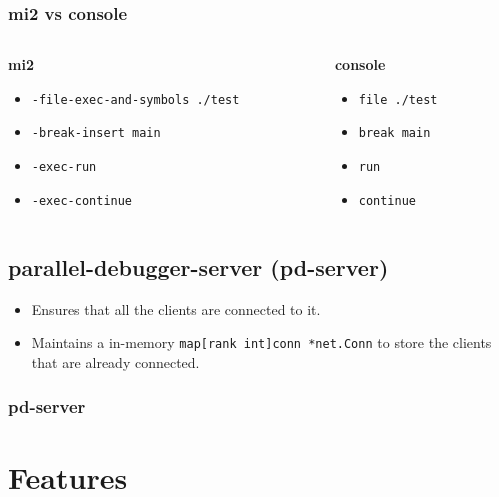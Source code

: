 \documentclass{beamer}
\begin{document}
\begin{frame}
  \frametitle{mi2 vs console}
  \begin{columns}
      \begin{column}{0.5\textwidth}
        \begin{center}
          \textbf{mi2}
          \end{center}
    \begin{itemize}
      \item <1-> \texttt{-file-exec-and-symbols ./test}
      \item <2-> \texttt{-break-insert main}
      \item <3-> \texttt{-exec-run}
      \item <4-> \texttt{-exec-continue}
      \end{itemize}
    \end{column}
    \begin{column}{0.5\textwidth}
      \begin{center}
        \textbf{console}
      \end{center}
      \begin{itemize}
      \item <1-> \texttt{file ./test}
      \item <2-> \texttt{break main}
      \item <3-> \texttt{run}
      \item <4-> \texttt{continue}
      \end{itemize}
    \end{column}
  \end{columns}
\end{frame}

\subsection{parallel-debugger-server (pd-server)}

\begin{frame}
  \begin{itemize}
  \item <1-> Ensures that all the clients are connected to it.
  \item <2-> Maintains a in-memory \texttt{map[rank int]conn *net.Conn} to store the clients that are already
    connected.
  \end{itemize}
  \frametitle{pd-server}
\end{frame}

\section{Features}
\end{document}
